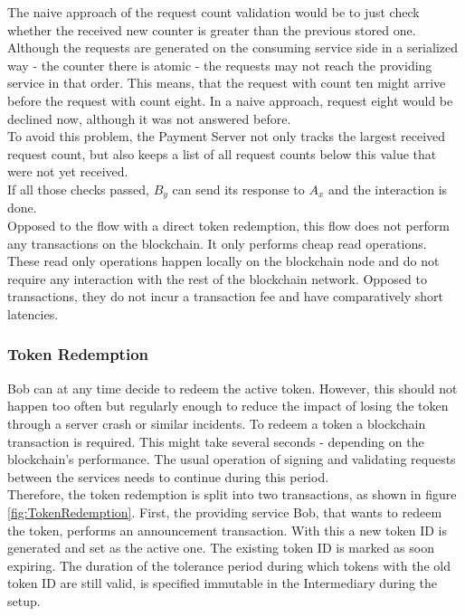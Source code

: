 \documentclass[a4paper,12pt]{scrartcl}
\begin{document}
The naive approach of the request count validation would be to just check whether the received new counter is greater than the previous stored one. Although the requests are generated on the consuming service side in a serialized way - the counter there is atomic - the requests may not reach the providing service in that order. This means, that the request with count ten might arrive before the request with count eight. In a naive approach, request eight would be declined now, although it was not answered before.\\
To avoid this problem, the Payment Server not only tracks the largest received request count, but also keeps a list of all request counts below this value that were not yet received.\\

If all those checks passed, $B_y$ can send its response to $A_x$ and the interaction is done.\\

Opposed to the flow with a direct token redemption, this flow does not perform any transactions on the blockchain. It only performs cheap read operations. These read only operations happen locally on the blockchain node and do not require any interaction with the rest of the blockchain network. Opposed to transactions, they do not incur a transaction fee and have comparatively short latencies.

\subsubsection{Token Redemption}

Bob can at any time decide to redeem the active token. However, this should not happen too often but regularly enough to reduce the impact of losing the token through a server crash or similar incidents. To redeem a token a blockchain transaction is required. This might take several seconds - depending on the blockchain's performance. The usual operation of signing and validating requests between the services needs to continue during this period.\\
Therefore, the token redemption is split into two transactions, as shown in figure \ref{fig:TokenRedemption}. First, the providing service Bob, that wants to redeem the token, performs an announcement transaction. With this a new token ID is generated and set as the active one. The existing token ID is marked as soon expiring. The duration of the tolerance period during which tokens with the old token ID are still valid, is specified immutable in the Intermediary during the setup.\\
\end{document}
